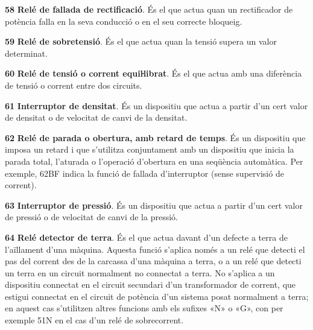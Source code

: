 \begin{multicols}{2}
\begin{list}{}
\item[\textbf{58}]   
\textbf{Relé de fallada de rectificació}. És el que actua quan un rectificador de potència falla en la seva conducció o en el seu correcte bloqueig.

\item[\textbf{59}]   
\textbf{Relé de sobretensió}. És el que
actua quan la tensió supera un valor determinat.

\item[\textbf{60}]   
\textbf{Relé de tensió o corrent equiŀlibrat}. És el que actua amb una diferència de tensió o
corrent entre dos circuits.

\item[\textbf{61}] 
 \textbf{Interruptor de densitat}. És un dispositiu que actua a partir d'un cert valor de densitat o de velocitat de canvi de la densitat.


\item[\textbf{62}]   
\textbf{Relé de
parada o obertura, amb retard de temps}. És un dispositiu que imposa un retard i que s'utilitza
conjuntament amb un dispositiu que inicia la parada total, l'aturada o l'operació
d'obertura en una seqüència automàtica. Per exemple, 62BF indica la funció de fallada d'interruptor (sense supervisió de corrent).

\item[\textbf{63}]   
\textbf{Interruptor de pressió}. És un dispositiu que actua a partir d'un cert valor de pressió o de velocitat de canvi de la pressió.

\item[\textbf{64}]    
\textbf{Relé detector de terra}.
És el que actua davant d'un defecte a terra de l'aïllament d'una
màquina. Aquesta funció s'aplica només a un relé que detecti el pas
del corrent des de la carcassa  d'una màquina a terra, o a un relé
que detecti un terra en un circuit normalment no connectat a terra. No
 s'aplica a un dispositiu connectat en el circuit secundari d'un
transformador de corrent, que estigui connectat en el circuit de
potència d'un sistema posat normalment a terra; en aquest cas s'utilitzen altres funcions amb els sufixes «N» o «G», con  per exemple 51N en el cas d'un relé de sobrecorrent.


\end{list}
\end{multicols}
